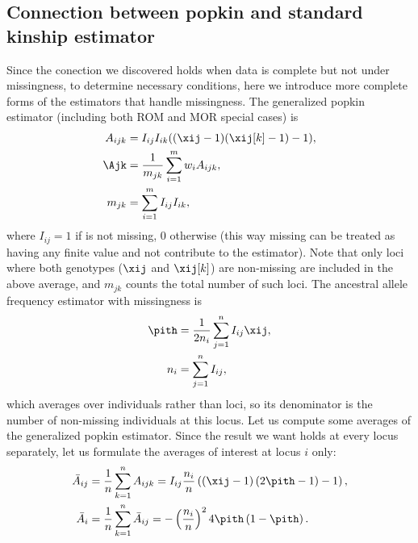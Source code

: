 \documentclass[11pt]{article}
\begin{document}
\begin{appendices}
  \section{Connection between popkin and standard kinship estimator}

  \label{sec:conn_popkin_std}  

  Since the conection we discovered holds when data is complete but not under missingness, to determine necessary conditions, here we introduce more complete forms of the estimators that handle missingness.
  The generalized popkin estimator (including both ROM and MOR special cases) is
  \begin{equation*}
    \begin{split}
      A_{ijk}
      &=
        I_{ij} I_{ik} ( (\xij-1)(\xij[k]-1) - 1 )
      , \\
      \Ajk
      &=
        \frac{1}{m_{jk}} \sum_{i=1}^m w_i A_{ijk}
        , \\
      m_{jk}
      &=
        \sum_{i=1}^m I_{ij} I_{ik}
        ,
    \end{split}
  \end{equation*}
  where $I_{ij} = 1$ if \xij is not missing, 0 otherwise (this way missing \xij can be treated as having any finite value and not contribute to the estimator).
  Note that only loci where both genotypes ($\xij$ and $\xij[k]$) are non-missing are included in the above average, and $m_{jk}$ counts the total number of such loci.
  The ancestral allele frequency estimator with missingness is
  \begin{align*}
    \pith
    &=
      \frac{1}{2 n_i} \sum_{j=1}^n I_{ij} \xij
      , \\
    n_i
    &=
      \sum_{j=1}^n I_{ij}
      ,
  \end{align*}
  which averages over individuals rather than loci, so its denominator is the number of non-missing individuals at this locus.
  Let us compute some averages of the generalized popkin estimator.
  Since the result we want holds at every locus separately, let us formulate the averages of interest at locus $i$ only:
  \begin{align*}
    \bar{A}_{ij}
    &=
      \frac{1}{n} \sum_{k=1}^n A_{ijk}
      =
      I_{ij} \frac{n_i}{n} \left( ( \xij - 1 ) \left( 2 \pith - 1 \right) - 1 \right)
      , \\
    \bar{A}_i
    &=
      \frac{1}{n} \sum_{k=1}^n \bar{A}_{ij}
      =
      - \left( \frac{n_i}{n} \right)^2 4 \pith \left( 1 - \pith \right)
      .

\end{align*}
\end{appendices}
\end{document}
